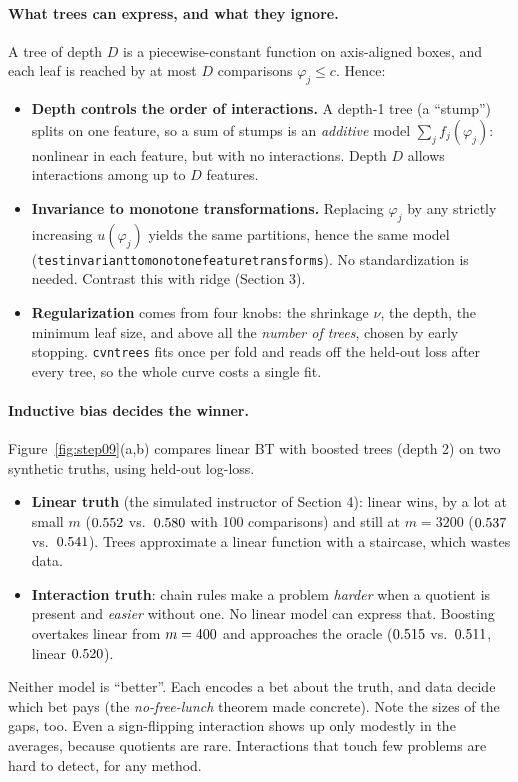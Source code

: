 \documentclass[11pt]{article}
\theoremstyle{definition}
\theoremstyle{plain}
\theoremstyle{remark}
\newcommand{\code}[1]{\texttt{#1}}
\renewcommand{\_}{\oldunderscore\allowbreak}
\begin{document}
\paragraph{What trees can express, and what they ignore.}
A tree of depth $D$ is a piecewise-constant function on axis-aligned boxes, and each leaf is reached by at most $D$ comparisons $\varphi_j\le c$. Hence:
\begin{itemize}[nosep]
\item \textbf{Depth controls the order of interactions.} A depth-1 tree (a ``stump'') splits on one feature, so a sum of stumps is an
  \emph{additive} model $\sum_jf_j(\varphi_j)$: nonlinear in each feature, but with no interactions. Depth $D$ allows interactions among up to $D$ features.
\item \textbf{Invariance to monotone transformations.} Replacing $\varphi_j$ by any strictly increasing $u(\varphi_j)$ yields the same partitions,
  hence the same model (\code{test\_invariant\_to\_monotone\_feature\_transforms}). No standardization is needed. Contrast this with ridge (Section 3).
\item \textbf{Regularization} comes from four knobs: the shrinkage $\nu$, the depth, the minimum leaf size, and above all the \emph{number of trees}, chosen by
  early stopping. \code{cv\_n\_trees} fits once per fold and reads off the held-out loss after every tree, so the whole curve costs a single fit.
\end{itemize}

\paragraph{Inductive bias decides the winner.}
Figure~\ref{fig:step09}(a,b) compares linear BT with boosted trees (depth 2) on two synthetic truths, using held-out log-loss.
\begin{itemize}[nosep]
\item \textbf{Linear truth} (the simulated instructor of Section 4): linear wins, by a lot at small $m$ ($0.552$ vs.\ $0.580$ with 100 comparisons)
  and still at $m=3200$ ($0.537$ vs.\ $0.541$). Trees approximate a linear function with a staircase, which wastes data.
\item \textbf{Interaction truth}: chain rules make a problem \emph{harder} when a quotient is present and \emph{easier} without one. No linear model can express that.
  Boosting overtakes linear from $m=400$ and approaches the oracle ($0.515$ vs.\ $0.511$, linear $0.520$).
\end{itemize}
Neither model is ``better''. Each encodes a bet about the truth, and data decide which bet pays (the \emph{no-free-lunch} theorem made concrete).
Note the sizes of the gaps, too. Even a sign-flipping interaction shows up only modestly in the averages, because quotients are rare. Interactions that touch
few problems are hard to detect, for any method.
\end{document}
